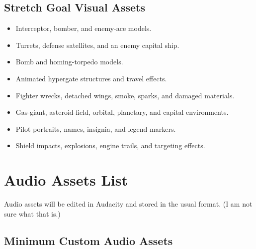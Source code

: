 \documentclass[journal]{IEEEtran}
\begin{document}
\subsection{Stretch Goal Visual Assets}

\begin{itemize}

    \item Interceptor, bomber, and enemy-ace models.
    \item Turrets, defense satellites, and an enemy capital ship.
    \item Bomb and homing-torpedo models.
    \item Animated hypergate structures and travel effects.
    \item Fighter wrecks, detached wings, smoke, sparks, and damaged materials.
    \item Gas-giant, asteroid-field, orbital, planetary, and capital environments.
    \item Pilot portraits, names, insignia, and legend markers.
    \item Shield impacts, explosions, engine trails, and targeting effects.

\end{itemize}


\section{Audio Assets List}

Audio assets will be edited in Audacity and stored in the usual format. (I am not sure what that is.)

\subsection{Minimum Custom Audio Assets}
\end{document}
